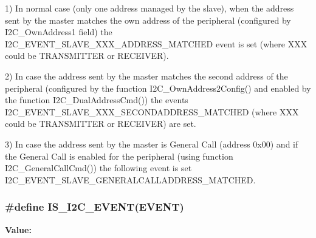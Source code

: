 1) In normal case (only one address managed by the slave), when the address sent by the master matches the own address of the peripheral (configured by I2C\_\-OwnAddress1 field) the I2C\_\-EVENT\_\-SLAVE\_\-XXX\_\-ADDRESS\_\-MATCHED event is set (where XXX could be TRANSMITTER or RECEIVER).

2) In case the address sent by the master matches the second address of the peripheral (configured by the function I2C\_\-OwnAddress2Config() and enabled by the function I2C\_\-DualAddressCmd()) the events I2C\_\-EVENT\_\-SLAVE\_\-XXX\_\-SECONDADDRESS\_\-MATCHED (where XXX could be TRANSMITTER or RECEIVER) are set.

3) In case the address sent by the master is General Call (address 0x00) and if the General Call is enabled for the peripheral (using function I2C\_\-GeneralCallCmd()) the following event is set I2C\_\-EVENT\_\-SLAVE\_\-GENERALCALLADDRESS\_\-MATCHED. \hypertarget{group__I2C__Events_ga4b42e6936006195f89ff4f763d366970}{
\subsubsection[{IS\_\-I2C\_\-EVENT}]{\setlength{\rightskip}{0pt plus 5cm}\#define IS\_\-I2C\_\-EVENT(EVENT)}}
\label{group__I2C__Events_ga4b42e6936006195f89ff4f763d366970}
{\bfseries Value:}

